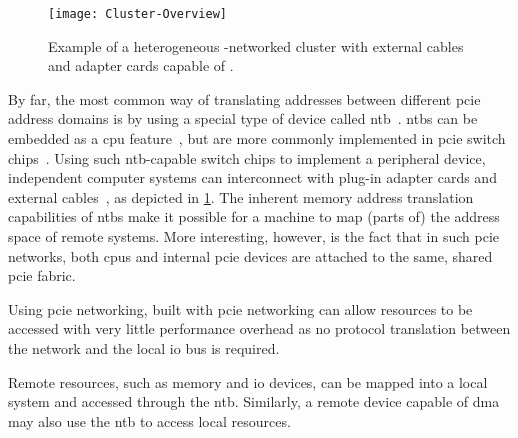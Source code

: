 \begin{figure}
	\centering
	\texttt{[image: Cluster-Overview]}
    \caption{Example of a heterogeneous -networked cluster with external cables and adapter cards capable of .}
  	\label{fig:cluster-example}
\end{figure}


By far, the most common way of translating addresses between different \gls{pcie} address domains is by using a special type of device called \gls{ntb}~\cite{whitepaper:PLX,whitepaper:Regula2004,Tu2018}.
%
\Glspl{ntb} can be embedded as a \gls{cpu} feature~\cite{whitepaper:Sullivan2010,url:LinuxNTB-AMD}, but are more commonly implemented in \gls{pcie} switch chips~\cite{whitepaper:PLX,pex8733}.
%
Using such \gls{ntb}-capable switch chips to implement a peripheral device, independent computer systems can interconnect with plug-in adapter cards and external cables~\cite{Ravindran2008,Lim2019,Tu2014,Tu2018}, as depicted in \cref{fig:cluster-example}.
%
The inherent memory address translation capabilities of \glspl{ntb} make it possible for a machine to map (parts of) the address space of remote systems.
%
More interesting, however, is the fact that in such \gls{pcie} networks, both \glspl{cpu} and internal \gls{pcie} devices are attached to the same, shared \gls{pcie} fabric.


Using \gls{pcie} networking, built with \gls{pcie} networking can allow resources to be accessed with very little performance overhead as no protocol translation between the network and the local \gls{io} bus is required.


Remote resources, such as memory and \gls{io} devices, can be mapped into a local system and accessed through the \gls{ntb}.
Similarly, a remote device capable of \gls{dma} may also use the \gls{ntb} to access local resources.

